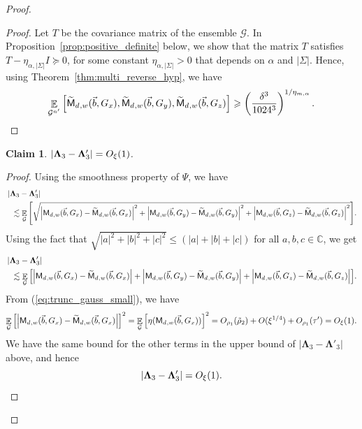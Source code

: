 \documentclass[10pt,a4paper]{amsart}
\newtheorem{claim}[thm]{Claim}
\newcommand\card[1]{\left| {#1} \right|}
\newcommand\Expect[2]{{\mathop{\mathbb{E}}_{#1}\left[ {#2} \right]}}
\renewcommand\geq{\geqslant}
\renewcommand\leq{\leqslant}
\newcommand{\V}[1]{{#1}}
\begin{document}
\begin{proof}
\begin{proof}
Let $T$ be the covariance matrix of the ensemble $\mathcal{G}$. In Proposition~\ref{prop:positive_definite} below, we show that the matrix $T$ satisfies $T-\eta_{\alpha, |\Sigma|} I\succeq 0$, for some constant $\eta_{\alpha, |\Sigma|}>0$ that depends on $\alpha$ and $|\Sigma|$. Hence, using Theorem~\ref{thm:multi_reverse_hyp}, we have
    \begin{align*}
        \Expect{\mathcal{G}^{n'}}{ \truncmultilinfcoarsedecoupled_{,\V w}(\vec{b}, \V G_x),\truncmultilinfcoarsedecoupled_{,\V w}(\vec{b}, \V G_y), \truncmultilinfcoarsedecoupled_{,\V w}(\vec{b},  \V G_z)}\geq \left(\frac{\delta^3}{1024^3}\right)^{1/\eta_{m,\alpha}}.
    \end{align*}
   \end{proof}


 \begin{claim}\label{claim:inv_trunc_gauss}
       $\card{{\bf \Lambda}_3 - {\bf \Lambda}'_3} = O_\xi(1)$.
   \end{claim}
   \begin{proof}
       Using the smoothness property of $\Psi$, we have 
       \begin{align*}
          & \card{\mathbf{\Lambda}_3 -  \mathbf{\Lambda}'_3 } \\
          &~~
          \lesssim \Expect{\substack{\mathcal{G}}}{\sqrt{\card{\multilinfcoarsedecoupled_{,\V w}(\vec{b},G_x) - \truncmultilinfcoarsedecoupled_{,\V w}(\vec{b},G_x) }^2 + \card{\multilinfcoarsedecoupled_{,\V w}(\vec{b},G_y) - \truncmultilinfcoarsedecoupled_{,\V w}(\vec{b},G_y) }^2+ \card{\multilinfcoarsedecoupled_{,\V w}(\vec{b},G_z) - \truncmultilinfcoarsedecoupled_{,\V w}(\vec{b},G_z) }^2}}.
           \end{align*}
           Using the fact that $\sqrt{\card{a}^2+\card{b}^2+\card{c}^2} \leq (\card{a}+\card{b}+\card{c})$ for all $a, b, c\in \mathbb{C}$, we get
           \begin{align*}
          & \card{\mathbf{\Lambda}_3 -  \mathbf{\Lambda}'_3 } \\
          &~~
          \lesssim \Expect{\substack{\mathcal{G}}}{\card{\multilinfcoarsedecoupled_{,\V w}(\vec{b},G_x) - \truncmultilinfcoarsedecoupled_{,\V w}(\vec{b},G_x) } + \card{\multilinfcoarsedecoupled_{,\V w}(\vec{b},G_y) - \truncmultilinfcoarsedecoupled_{,\V w}(\vec{b},G_y) } + \card{\multilinfcoarsedecoupled_{,\V w}(\vec{b},G_z) - \truncmultilinfcoarsedecoupled_{,\V w}(\vec{b},G_z) }}.
           \end{align*}
     From (\ref{eq:trunc_gauss_small}), we have
     $$\Expect{\substack{\mathcal{G}}}{\card{\multilinfcoarsedecoupled_{,\V w}(\vec{b},G_x) - \truncmultilinfcoarsedecoupled_{,\V w}(\vec{b},G_x) }}^2  = \Expect{\substack{\mathcal{G}}}{\eta(\multilinfcoarsedecoupled_{,\V w}(\vec{b},G_x))}^2 = O_{\rho_1}(\tilde{\rho}_2) + O(\xi^{1/4}) + O_{\rho_1}(\tau') = O_\xi(1). $$
    We have the same bound for the other terms in the upper bound of $\card{\mathbf{\Lambda}_3 -  \mathbf{\Lambda}'_3 }$ above, and hence 
    \[
    \card{\mathbf{\Lambda}_3 -  \mathbf{\Lambda}'_3 } = O_{\xi}(1).
    \qedhere
    \]
   \end{proof}


\end{proof}
\end{document}
